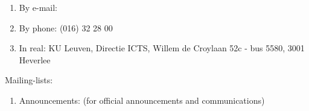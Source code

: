 \begin{enumerate}
\item  By e-mail:  \hpcinfo
\item  By phone: (016) 32 28 00
\item  In real: KU Leuven, Directie ICTS, Willem de Croylaan 52c - bus 5580, 3001 Heverlee
\end{enumerate}

Mailing-lists:

\begin{enumerate}
\item  Announcements: \hpcannounceml (for official announcements and communications)
\end{enumerate}

